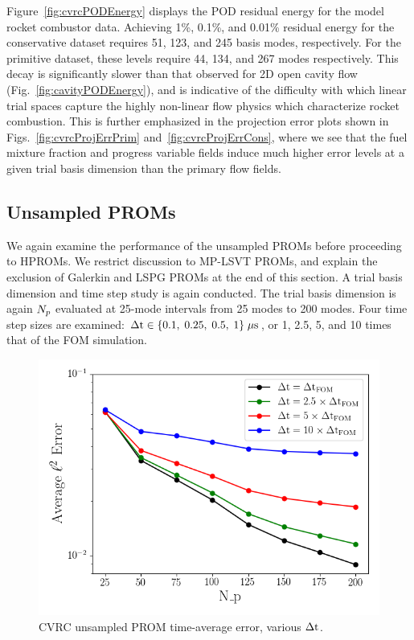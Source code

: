 Figure~\ref{fig:cvrcPODEnergy} displays the POD residual energy for the model rocket combustor data. Achieving 1\%, 0.1\%, and 0.01\% residual energy for the conservative dataset requires 51, 123, and 245 basis modes, respectively. For the primitive dataset, these levels require 44, 134, and 267 modes respectively. This decay is significantly slower than that observed for 2D open cavity flow (Fig.~\ref{fig:cavityPODEnergy}), and is indicative of the difficulty with which linear trial spaces capture the highly non-linear flow physics which characterize rocket combustion. This is further emphasized in the projection error plots shown in Figs.~\ref{fig:cvrcProjErrPrim} and~\ref{fig:cvrcProjErrCons}, where we see that the fuel mixture fraction and progress variable fields induce much higher error levels at a given trial basis dimension than the primary flow fields.

\subsection{Unsampled PROMs}

We again examine the performance of the unsampled PROMs before proceeding to HPROMs. We restrict discussion to MP-LSVT PROMs, and explain the exclusion of Galerkin and LSPG PROMs at the end of this section. A trial basis dimension and time step study is again conducted. The trial basis dimension is again $N_p$ evaluated at 25-mode intervals from 25 modes to 200 modes. Four time step sizes are examined: $\Delta \text{t} \in \{ 0.1, \; 0.25, \; 0.5, \; 1 \} \; \mu \text{s}$, or 1, 2.5, 5, and 10 times that of the FOM simulation.

\begin{figure}
	\centering
	\includegraphics[width=0.7\linewidth]{Chapters/CavityAndCVRC/Images/cvrc/unsampled/unsampled_avg_mode_Average_errorRaw.png}
	\caption{\label{fig:cavityUnsampledROMErrVsModes}CVRC unsampled PROM time-average error, various $\Delta \text{t}$.}
\end{figure}

